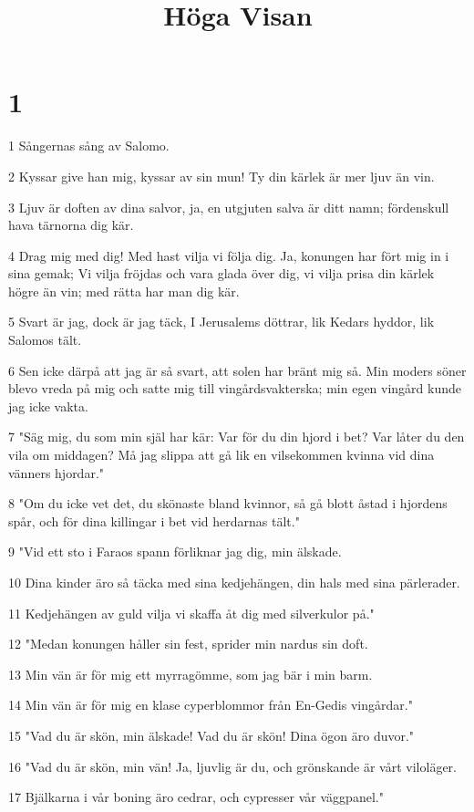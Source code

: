 

\title{Höga Visan}


\chapter{1}

\par 1 Sångernas sång av Salomo.
\par 2 Kyssar give han mig, kyssar av sin mun! Ty din kärlek är mer ljuv än vin.
\par 3 Ljuv är doften av dina salvor, ja, en utgjuten salva är ditt namn; fördenskull hava tärnorna dig kär.
\par 4 Drag mig med dig! Med hast vilja vi följa dig. Ja, konungen har fört mig in i sina gemak; Vi vilja fröjdas och vara glada över dig, vi vilja prisa din kärlek högre än vin; med rätta har man dig kär.
\par 5 Svart är jag, dock är jag täck, I Jerusalems döttrar, lik Kedars hyddor, lik Salomos tält.
\par 6 Sen icke därpå att jag är så svart, att solen har bränt mig så. Min moders söner blevo vreda på mig och satte mig till vingårdsvakterska; min egen vingård kunde jag icke vakta.
\par 7 "Säg mig, du som min själ har kär: Var för du din hjord i bet? Var låter du den vila om middagen? Må jag slippa att gå lik en vilsekommen kvinna vid dina vänners hjordar."
\par 8 "Om du icke vet det, du skönaste bland kvinnor, så gå blott åstad i hjordens spår, och för dina killingar i bet vid herdarnas tält."
\par 9 "Vid ett sto i Faraos spann förliknar jag dig, min älskade.
\par 10 Dina kinder äro så täcka med sina kedjehängen, din hals med sina pärlerader.
\par 11 Kedjehängen av guld vilja vi skaffa åt dig med silverkulor på."
\par 12 "Medan konungen håller sin fest, sprider min nardus sin doft.
\par 13 Min vän är för mig ett myrragömme, som jag bär i min barm.
\par 14 Min vän är för mig en klase cyperblommor från En-Gedis vingårdar."
\par 15 "Vad du är skön, min älskade! Vad du är skön! Dina ögon äro duvor."
\par 16 "Vad du är skön, min vän! Ja, ljuvlig är du, och grönskande är vårt viloläger.
\par 17 Bjälkarna i vår boning äro cedrar, och cypresser vår väggpanel."

